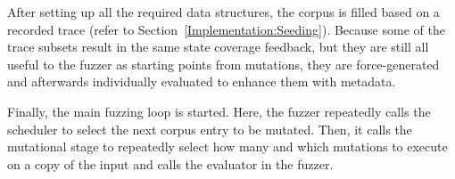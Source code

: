 \documentclass{article}
\newcommand{\code}[2][]{\lstinline[language=#1, breaklines=false, basicstyle=\ttfamily]{#2}}
\let\savedCite=\cite
\renewcommand{\cite}{\unskip~\savedCite}
\begin{document}
\begin{multicols}{2}

  After setting up all the required data structures, the corpus is filled based on a recorded trace (refer to Section~\ref{Implementation:Seeding}). Because some of the trace subsets result in the same state coverage feedback, but they are still all useful to the fuzzer as starting points from mutations, they are force-generated and afterwards individually evaluated to enhance them with metadata.

  Finally, the main fuzzing loop is started. Here, the fuzzer repeatedly calls the scheduler to select the next corpus entry to be mutated. Then, it calls the mutational stage to repeatedly select how many and which mutations to execute on a copy of the input and calls the evaluator in the fuzzer.


\end{multicols}
\end{document}
